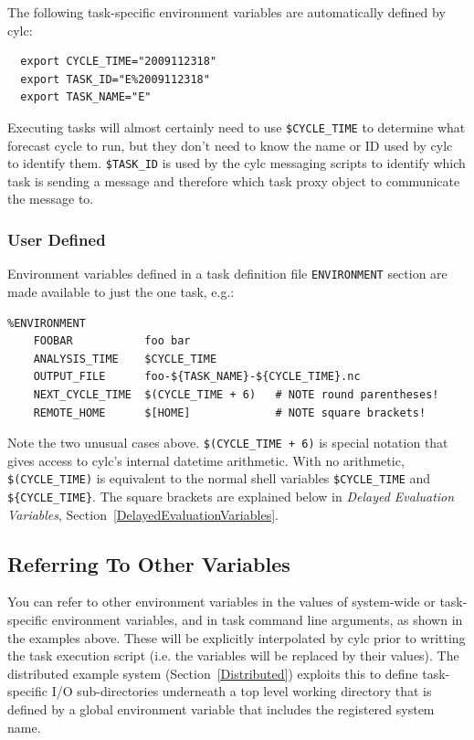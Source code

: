 \documentclass[11pt,a4paper]{article}
\begin{document}
The following task-specific environment variables are automatically
defined by cylc:

\begin{lstlisting}
  export CYCLE_TIME="2009112318"
  export TASK_ID="E%2009112318"
  export TASK_NAME="E"
\end{lstlisting}

Executing tasks will almost certainly need to use
\lstinline=$CYCLE_TIME= to determine what forecast cycle to run,
but they don't need to know the name or ID used by cylc to identify
them. \lstinline=$TASK_ID= is used by the cylc messaging scripts to
identify which task is sending a message and therefore which task proxy
object to communicate the message to.


\subsubsection{User Defined}
\label{TaskSpecificVariables}

\lstset{language=cylctaskdef}

Environment variables defined in a task definition file
\lstinline=ENVIRONMENT= section are made available
to just the one task, e.g.:

\begin{lstlisting}
%ENVIRONMENT
    FOOBAR           foo bar
    ANALYSIS_TIME    $CYCLE_TIME
    OUTPUT_FILE      foo-${TASK_NAME}-${CYCLE_TIME}.nc
    NEXT_CYCLE_TIME  $(CYCLE_TIME + 6)   # NOTE round parentheses!
    REMOTE_HOME      $[HOME]             # NOTE square brackets!
\end{lstlisting}

\lstset{language=bash}

Note the two unusual cases above. \lstinline=$(CYCLE_TIME + 6)= is 
special notation that gives access to cylc's internal datetime arithmetic.
With no arithmetic, \lstinline=$(CYCLE_TIME)= is equivalent to 
the normal shell variables \lstinline=$CYCLE_TIME= and
\lstinline=${CYCLE_TIME}=. The square brackets are explained 
below in {\em Delayed Evaluation Variables},
Section~\ref{DelayedEvaluationVariables}.

\subsection{Referring To Other Variables}
\label{ReferringToOtherVariables}

\lstset{language=bash}

You can refer to other environment variables in the values of
system-wide or task-specific environment variables, and in task command
line arguments, as shown in the examples above. These will be explicitly
interpolated by cylc prior to writting the task execution script (i.e.
the variables will be replaced by their values). The distributed example
system (Section~\ref{Distributed}) exploits this to define task-specific
I/O sub-directories underneath a top level working directory that is
defined by a global environment variable that includes the registered
system name.
\end{document}

